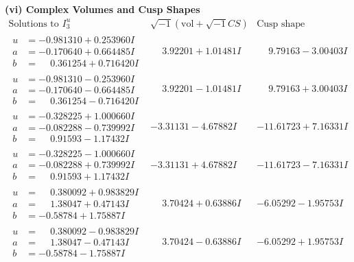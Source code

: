 \documentclass[1p]{elsarticle_modified}
\theoremstyle{definition}
\newcommand{\I}{\sqrt{-1}}
\begin{document}
\newpage\flushleft \textbf{(vi) Complex Volumes and Cusp Shapes}
$$\begin{array}{c|c|c}  
\text{Solutions to }I^u_{3}& \I (\text{vol} + \sqrt{-1}CS) & \text{Cusp shape}\\
 \hline 
\begin{aligned}
u &= -0.981310 + 0.253960 I \\
a &= -0.170640 + 0.664485 I \\
b &= \phantom{-}0.361254 + 0.716420 I\end{aligned}
 & \phantom{-}3.92201 + 1.01481 I & \phantom{-}9.79163 - 3.00403 I \\ \hline\begin{aligned}
u &= -0.981310 - 0.253960 I \\
a &= -0.170640 - 0.664485 I \\
b &= \phantom{-}0.361254 - 0.716420 I\end{aligned}
 & \phantom{-}3.92201 - 1.01481 I & \phantom{-}9.79163 + 3.00403 I \\ \hline\begin{aligned}
u &= -0.328225 + 1.000660 I \\
a &= -0.082288 - 0.739992 I \\
b &= \phantom{-}0.91593 - 1.17432 I\end{aligned}
 & -3.31131 - 4.67882 I & -11.61723 + 7.16331 I \\ \hline\begin{aligned}
u &= -0.328225 - 1.000660 I \\
a &= -0.082288 + 0.739992 I \\
b &= \phantom{-}0.91593 + 1.17432 I\end{aligned}
 & -3.31131 + 4.67882 I & -11.61723 - 7.16331 I \\ \hline\begin{aligned}
u &= \phantom{-}0.380092 + 0.983829 I \\
a &= \phantom{-}1.38047 + 0.47143 I \\
b &= -0.58784 + 1.75887 I\end{aligned}
 & \phantom{-}3.70424 + 0.63886 I & -6.05292 - 1.95753 I \\ \hline\begin{aligned}
u &= \phantom{-}0.380092 - 0.983829 I \\
a &= \phantom{-}1.38047 - 0.47143 I \\
b &= -0.58784 - 1.75887 I\end{aligned}
 & \phantom{-}3.70424 - 0.63886 I & -6.05292 + 1.95753 I \\ \hline\begin{aligned}

\end{aligned}
\end{array}$$
\end{document}
